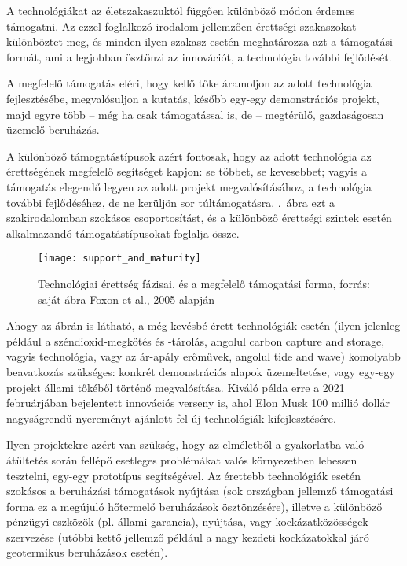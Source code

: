 \documentclass[twoside, magyar, showtrims]{corvinusphd}
\begin{document}
A technológiákat az életszakaszuktól függően különböző
módon érdemes támogatni. Az ezzel foglalkozó irodalom
jellemzően érettségi szakaszokat különböztet meg, 
és minden ilyen szakasz esetén meghatározza azt a támogatási
formát, ami a legjobban ösztönzi az innovációt, a technológia 
további fejlődését.

A megfelelő támogatás eléri, hogy kellő tőke áramoljon
az adott technológia fejlesztésébe, megvalósuljon a kutatás,
később egy-egy demonstrációs projekt, majd egyre több
-- még ha csak támogatással is, de -- megtérülő, gazdaságosan
üzemelő beruházás. 

A különböző támogatástípusok azért 
fontosak, hogy az adott technológia az érettségének megfelelő
segítséget kapjon: se többet, se kevesebbet; vagyis a támogatás
elegendő legyen az adott projekt megvalósításához, a technológia
további fejlődéséhez, de ne kerüljön sor túltámogatásra.
.~ábra ezt a szakirodalomban
szokásos csoportosítást, és a különböző érettségi szintek esetén
alkalmazandó támogatástípusokat foglalja össze.

\begin{figure}
    \centering
    \texttt{[image: support\_and\_maturity]}
    \caption{Technológiai érettség fázisai, és a megfelelő támogatási forma, forrás: saját ábra Foxon et al., 2005 alapján}
    \label{fig:support_and_maturity}
\end{figure}

Ahogy az ábrán is látható, a még kevésbé érett technológiák esetén
(ilyen jelenleg például a széndioxid-megkötés és -tárolás, angolul
carbon capture and storage, vagyis  technológia,
vagy az ár-apály erőművek, 
angolul tide and wave) komolyabb beavatkozás szükséges: konkrét
demonstrációs alapok üzemeltetése, vagy egy-egy projekt állami tőkéből
történő megvalósítása. Kiváló példa erre a 2021 februárjában
bejelentett innovációs verseny is, ahol Elon Musk
100 millió dollár nagyságrendű nyereményt
ajánlott fel új  technológiák kifejlesztésére.

Ilyen projektekre azért van szükség, hogy az elméletből
a gyakorlatba való átültetés során fellépő esetleges problémákat
valós környezetben lehessen tesztelni, egy-egy prototípus segítségével.
Az érettebb technológiák esetén szokásos a beruházási támogatások nyújtása
(sok országban jellemző támogatási forma ez a megújuló hőtermelő
beruházások ösztönzésére), illetve a különböző
pénzügyi eszközök (pl. állami garancia), 
nyújtása, vagy kockázatközösségek szervezése
(utóbbi kettő jellemző például a nagy kezdeti
kockázatokkal járó geotermikus beruházások esetén).
\end{document}
